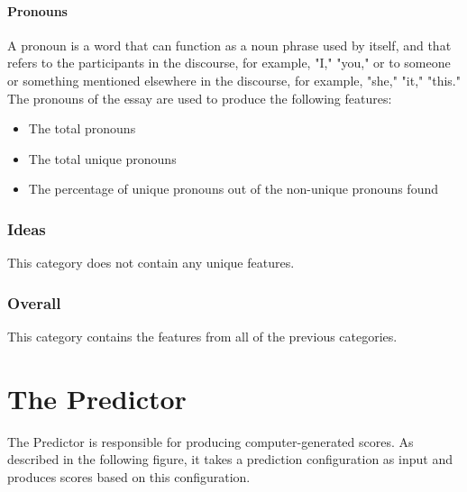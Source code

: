 \paragraph{Pronouns}
A pronoun is a word that can function as a noun phrase used by itself, and that refers to the participants in the discourse, for example, "I," "you," or to someone or something mentioned elsewhere in the discourse, for example, "she," "it," "this." The pronouns of the essay are used to produce the following features:
\begin{itemize}
 \item The total pronouns 
 \item The total unique pronouns
 \item The percentage of unique pronouns out of the non-unique pronouns found
\end{itemize}

\subsubsection{Ideas }
This category does not contain any unique features. 

\subsubsection{Overall}
This category contains the features from all of the previous categories.


\section{The Predictor}

The Predictor is responsible for producing computer-generated scores. As described in the following figure, it takes a prediction configuration as input and produces scores based on this configuration.


